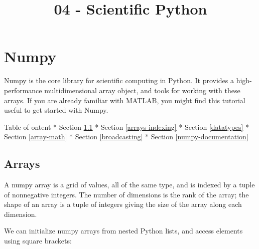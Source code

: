 \documentclass[11pt]{article}
\title{04 - Scientific Python}
\begin{document}
    
    
    \maketitle
    
    

    
    \hypertarget{numpy}{%
\section{Numpy}\label{numpy}}

Numpy is the core library for scientific computing in Python. It
provides a high-performance multidimensional array object, and tools for
working with these arrays. If you are already familiar with MATLAB, you
might find this tutorial useful to get started with Numpy.

Table of ontent * Section \ref{arrays} * Section \ref{arrays-indexing} *
Section \ref{datatypes} * Section \ref{array-math} *
Section \ref{broadcasting} * Section \ref{numpy-documentation}

    \hypertarget{arrays}{%
\subsection{Arrays }\label{arrays}}

A numpy array is a grid of values, all of the same type, and is indexed
by a tuple of nonnegative integers. The number of dimensions is the rank
of the array; the shape of an array is a tuple of integers giving the
size of the array along each dimension.

We can initialize numpy arrays from nested Python lists, and access
elements using square brackets:
\end{document}
